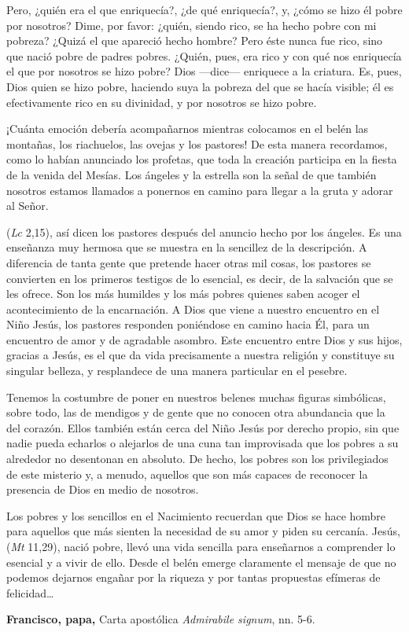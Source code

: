 \begin{body}
	Pero, ¿quién era el que enriquecía?, ¿de qué enriquecía?, y, ¿cómo se hizo él pobre por nosotros? Dime, por favor: ¿quién, siendo rico, se ha hecho pobre con mi pobreza? ¿Quizá el que apareció hecho hombre? Pero éste nunca fue rico, sino que nació pobre de padres pobres. ¿Quién, pues, era rico y con qué nos enriquecía el que por nosotros se hizo pobre? Dios ---dice--- enriquece a la criatura. Es, pues, Dios quien se hizo pobre, haciendo suya la pobreza del que se hacía visible; él es efectivamente rico en su divinidad, y por nosotros se hizo pobre.
\end{body}

\begin{patercite}
	¡Cuánta emoción debería acompañarnos mientras colocamos en el belén las montañas, los riachuelos, las ovejas y los pastores! De esta manera recordamos, como lo habían anunciado los profetas, que toda la creación participa en la fiesta de la venida del Mesías. Los ángeles y la estrella son la señal de que también nosotros estamos llamados a ponernos en camino para llegar a la gruta y adorar al Señor.
	
	 (\emph{Lc} 2,15), así dicen los pastores después del anuncio hecho por los ángeles. Es una enseñanza muy hermosa que se muestra en la sencillez de la descripción. A diferencia de tanta gente que pretende hacer otras mil cosas, los pastores se convierten en los primeros testigos de lo esencial, es decir, de la salvación que se les ofrece. Son los más humildes y los más pobres quienes saben acoger el acontecimiento de la encarnación. A Dios que viene a nuestro encuentro en el Niño Jesús, los pastores responden poniéndose en camino hacia Él, para un encuentro de amor y de agradable asombro. Este encuentro entre Dios y sus hijos, gracias a Jesús, es el que da vida precisamente a nuestra religión y constituye su singular belleza, y resplandece de una manera particular en el pesebre.
	
	Tenemos la costumbre de poner en nuestros belenes muchas figuras simbólicas, sobre todo, las de mendigos y de gente que no conocen otra abundancia que la del corazón. Ellos también están cerca del Niño Jesús por derecho propio, sin que nadie pueda echarlos o alejarlos de una cuna tan improvisada que los pobres a su alrededor no desentonan en absoluto. De hecho, los pobres son los privilegiados de este misterio y, a menudo, aquellos que son más capaces de reconocer la presencia de Dios en medio de nosotros.
	
	Los pobres y los sencillos en el Nacimiento recuerdan que Dios se hace hombre para aquellos que más sienten la necesidad de su amor y piden su cercanía. Jesús,  (\emph{Mt} 11,29), nació pobre, llevó una vida sencilla para enseñarnos a comprender lo esencial y a vivir de ello. Desde el belén emerge claramente el mensaje de que no podemos dejarnos engañar por la riqueza y por tantas propuestas efímeras de felicidad\ldots{}
	
	\textbf{Francisco, papa,} Carta apostólica \emph{Admirabile signum}, nn. 5-6.
\end{patercite}

